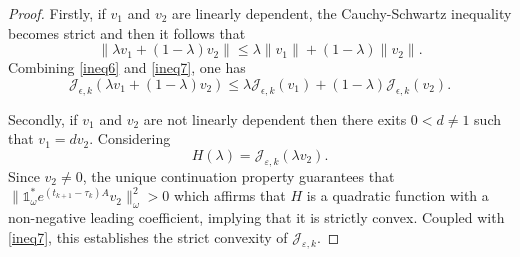 \documentclass[sn-mathphys]{sn-jnl}
\begin{document}
\begin{proof}
    Firstly, if $v_1$ and $v_2$ are linearly dependent, the Cauchy-Schwartz inequality becomes strict and then it follows that
    \begin{equation}\label{ineq7}
        \| \lambda v_1 + (1-\lambda) v_2 \| \leq \lambda \|v_1\| + (1-\lambda) \|v_2\|.
    \end{equation}
    Combining \eqref{ineq6} and \eqref{ineq7}, one has
    \begin{equation*}
        \mathcal{J}_{\epsilon,k}(\lambda v_1 + (1-\lambda) v_2) \leq \lambda \mathcal{J}_{\epsilon,k}(v_1)+(1-\lambda) \mathcal{J}_{\epsilon,k}(v_2).
    \end{equation*}
    
    Secondly, if $v_1$ and $v_2$ are not linearly dependent then there exits $0<d \neq 1$ such that $v_1 = d v_2$. Considering
    \[H(\lambda)= \mathcal{J}_{\varepsilon,k}(\lambda v_2).\]
    Since \(v_2 \neq 0\), the unique continuation property guarantees that \(\| \mathds{1}_{\omega}^{*} e^{(t_{k+1}-\tau_k)A} v_2 \|_{\omega}^2 >0\) which affirms that $H$ is a quadratic function with a non-negative leading coefficient, implying that it is strictly convex. Coupled with \eqref{ineq7}, this establishes the strict convexity of \(\mathcal{J}_{\varepsilon,k}\).


\end{proof}
\end{document}
